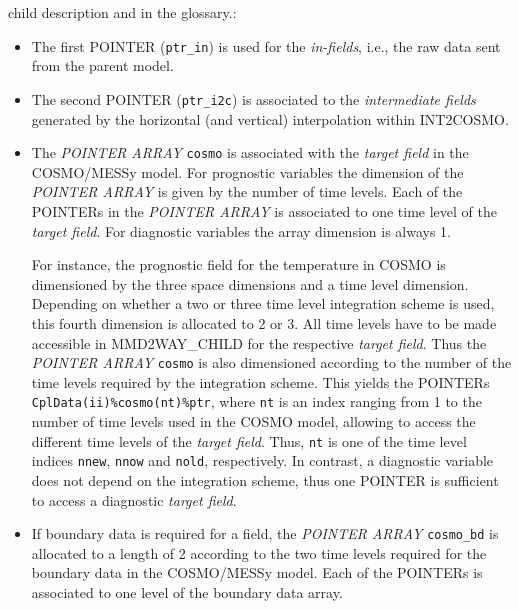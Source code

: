 \documentclass[11pt,twoside]{article}
\begin{document}
\begin{itemize}
{child description and in the glossary.}:
\begin{itemize}
\item  The first {\footnotesize POINTER} (\verb|ptr_in|) is used for
the {\it in-fields}, i.e., the raw data sent from the parent model.
\item The second {\footnotesize POINTER} (\verb|ptr_i2c|) is associated to the 
{\it intermediate fields}
generated by the horizontal (and vertical) interpolation within INT2COSMO. 
\item The {\footnotesize \it POINTER ARRAY} \verb|cosmo| is associated 
with the {\it target field} in the COSMO/MESSy model. For prognostic variables 
the dimension of the {\footnotesize \it POINTER ARRAY} is given by the number of 
time levels. Each of the {\footnotesize POINTERs} in the 
{\footnotesize \it POINTER ARRAY} is associated to one time level of the 
{\it target 
field}. For diagnostic variables the array dimension is always 1.

\par\noindent For instance,
the prognostic field for the temperature in COSMO is dimensioned by the three
space dimensions and a time level dimension. Depending on whether a two or three
time level integration scheme is used, this fourth dimension is 
allocated to 2 or 3. All time levels have to be made accessible in MMD2WAY\_CHILD
for the respective {\it target field}. Thus the {\footnotesize \it POINTER ARRAY}
\verb|cosmo| is also dimensioned according to the number of the time levels
required by the integration scheme. This yields the {\footnotesize POINTER}s 
 \verb|CplData(ii)%cosmo(nt)%ptr|, where \verb|nt| is an index ranging from 1 to
the number of time levels used in the COSMO model, allowing to access the 
different time levels of the {\it target field}. Thus, \verb|nt| is one of the
time level indices \verb|nnew|, \verb|nnow| and \verb|nold|, respectively.  
 In contrast, a diagnostic variable does not
 depend on the integration scheme, thus one {\footnotesize POINTER} is
sufficient to access a diagnostic {\it target field}. 

\item If boundary data is required for a field, the 
{\footnotesize \it POINTER ARRAY} \verb|cosmo_bd| is allocated to a length of 2
 according to the two time levels
required for the boundary data in the COSMO/MESSy model.
 Each of the {\footnotesize POINTERs} is associated to one
level of the boundary data array.
\end{itemize}
\end{itemize}
\end{document}
